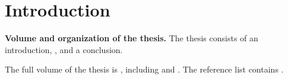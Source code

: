 \chapter*{Introduction}                         %

\newcommand{\actuality}{\textbf{\actualityTXT}}
\newcommand{\progress}{\textbf{\progressTXT}}
\newcommand{\aim}{{\textbf\aimTXT}}
\newcommand{\tasks}{\textbf{\tasksTXT}}
\newcommand{\novelty}{\textbf{\noveltyTXT}}
\newcommand{\influencePr}{\textbf{\influencePrTXT}}
\newcommand{\influenceTh}{\textbf{\influenceThTXT}}
\newcommand{\methods}{\textbf{\methodsTXT}}
\newcommand{\defpositions}{\textbf{\defpositionsTXT}}
\newcommand{\reliability}{\textbf{\reliabilityTXT}}
\newcommand{\probation}{\textbf{\probationTXT}}
\newcommand{\contribution}{\textbf{\contributionTXT}}
\newcommand{\publications}{\textbf{\publicationsTXT}}


\textbf{Volume and organization of the thesis.} The thesis consists of an introduction, , and a conclusion.
%

The full volume of the thesis is
, including
 and
.
The reference list contains
.
